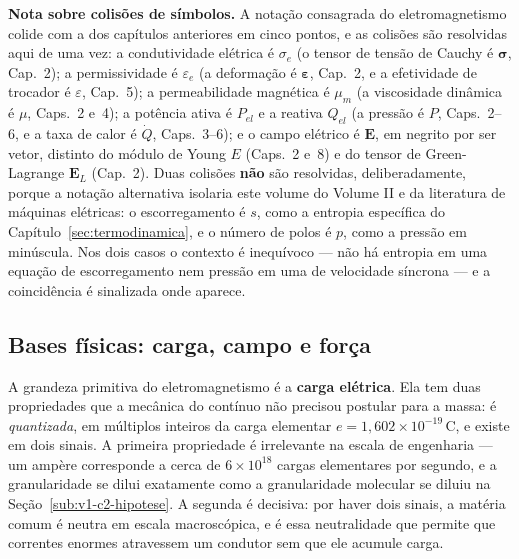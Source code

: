 \documentclass[12pt,a4paper]{article}
\numberwithin{equation}{section}
\numberwithin{table}{section}
\numberwithin{figure}{section}
\begin{document}
\textbf{Nota sobre colisões de símbolos.} A notação consagrada do
eletromagnetismo colide com a dos capítulos anteriores em cinco pontos, e as
colisões são resolvidas aqui de uma vez: a condutividade elétrica é
$\sigma_e$ (o tensor de tensão de Cauchy é $\boldsymbol{\sigma}$, Cap.~2); a
permissividade é $\varepsilon_e$ (a deformação é $\boldsymbol{\varepsilon}$,
Cap.~2, e a efetividade de trocador é $\varepsilon$, Cap.~5); a permeabilidade
magnética é $\mu_m$ (a viscosidade dinâmica é $\mu$, Caps.~2 e~4); a potência
ativa é $P_{el}$ e a reativa $Q_{el}$ (a pressão é $P$, Caps.~2--6, e a taxa de
calor é $\dot{Q}$, Caps.~3--6); e o campo elétrico é $\mathbf{E}$, em negrito
por ser vetor, distinto do módulo de Young $E$ (Caps.~2 e~8) e do tensor de
Green-Lagrange $\mathbf{E}_L$ (Cap.~2). Duas colisões \textbf{não} são
resolvidas, deliberadamente, porque a notação alternativa isolaria este volume
do Volume II e da literatura de máquinas elétricas: o escorregamento é $s$,
como a entropia específica do Capítulo~\ref{sec:termodinamica}, e o número de
polos é $p$, como a pressão em minúscula. Nos dois casos o contexto é
inequívoco --- não há entropia em uma equação de escorregamento nem pressão em
uma de velocidade síncrona --- e a coincidência é sinalizada onde aparece.

\subsection{Bases físicas: carga, campo e força}\label{sub:v1-c7-bases}

A grandeza primitiva do eletromagnetismo é a \textbf{carga elétrica}. Ela tem
duas propriedades que a mecânica do contínuo não precisou postular para a
massa: é \emph{quantizada}, em múltiplos inteiros da carga elementar
$e = 1{,}602\times10^{-19}\,$C, e existe em dois sinais. A primeira propriedade
é irrelevante na escala de engenharia --- um ampère corresponde a cerca de
$6\times10^{18}$ cargas elementares por segundo, e a granularidade se dilui
exatamente como a granularidade molecular se diluiu na
Seção~\ref{sub:v1-c2-hipotese}. A segunda é decisiva: por haver dois sinais, a
matéria comum é neutra em escala macroscópica, e é essa neutralidade que
permite que correntes enormes atravessem um condutor sem que ele acumule carga.
\end{document}

